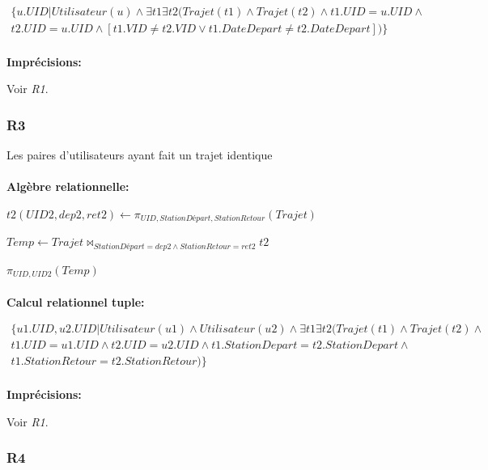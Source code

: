 \documentclass[a4paper, 12pt]{report}
\begin{document}
\begin{multline*}
\{ u.UID|Utilisateur(u)\wedge\exists t1\exists t2 ( Trajet(t1)\wedge Trajet(t2)\wedge t1.UID=u.UID\wedge \\
t2.UID=u.UID \wedge [t1.VID\neq t2.VID\vee t1.DateDepart\neq t2.DateDepart] )  \}
\end{multline*}

\paragraph{}
\textbf{Imprécisions:}

Voir \textit{R1}.

\subsubsection*{R3}

Les paires d'utilisateurs ayant fait un trajet identique
\paragraph{}
\textbf{Algèbre relationnelle:}

$t2(UID2,dep2,ret2)\leftarrow\pi_{UID,StationDépart,StationRetour}(Trajet)$

$Temp\leftarrow Trajet\bowtie_{StationDépart=dep2\wedge StationRetour=ret2}t2$

$\pi_{UID,UID2}(Temp)$

\paragraph{}
\textbf{Calcul relationnel tuple:}

\begin{multline*}
\{  u1.UID, u2.UID |Utilisateur(u1)\wedge Utilisateur(u2)\wedge\exists t1\exists t2 ( Trajet(t1)\wedge Trajet(t2) \wedge \\
 t1.UID=u1.UID \wedge t2.UID=u2.UID \wedge t1.StationDepart=t2.StationDepart \wedge \\
 t1.StationRetour=t2.StationRetour )  \}
\end{multline*}

\paragraph{}
\textbf{Imprécisions:}

Voir \textit{R1}.

\subsubsection*{R4}
\end{document}
